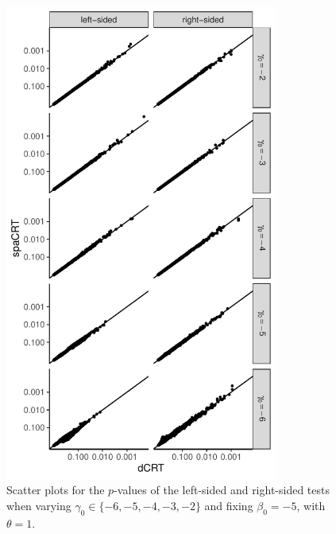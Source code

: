 \documentclass[12pt]{article}
\theoremstyle{definition}
\begin{document}
\begin{figure}
  \centering
  \includegraphics[width=0.8\textwidth]{figures-and-tables/simulation/QQ/plot-bin-NB-normal-B-50000-n-5000-5e3-n5-n5-disp-1full-dCRT-spaCRT-varying-gamma.pdf}
  \caption{Scatter plots for the $p$-values of the left-sided and right-sided tests when varying $\gamma_0\in \{-6,-5,-4,-3,-2\}$ and fixing $\beta_0=-5$, with $\theta = 1$.}
  \label{fig:simulation-dot-plot-varying-gamma-theta-1}
\end{figure}
\end{document}
